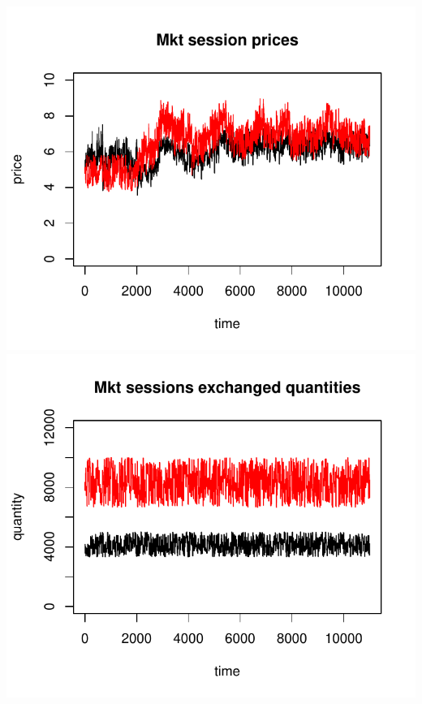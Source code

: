 \documentclass{article}
\begin{document}
\noindent
\vskip-5mm
\hskip-1cm
\includegraphics[scale=0.5]{fig_case05_prices}
\includegraphics[scale=0.5]{fig_case05_quantities}
\end{document}
